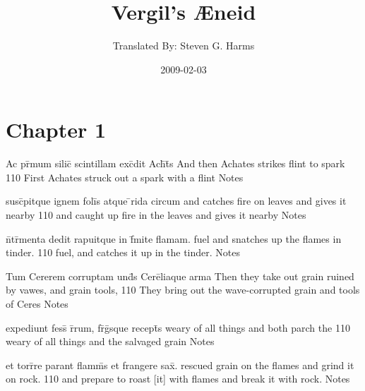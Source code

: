 \documentclass[]{book}
\title{Vergil's {\AE}neid}
\author{ Translated By:  Steven G. Harms }
\date{2009-02-03}
\begin{document}

\ifpdf
{}
\else
{}
\fi

\enumstyle 

\maketitle
\tableofcontents

\chapter{Chapter 1}
%
%
%
%
%
%


\latline
  {Ac pr\={\macron {\i}}mum silic\={\macron {\i}} scintillam exc\={}dit Ach\={}t\={}s}
  { And then Achates strikes flint to spark }
  {110}
  { First Achates struck out a spark with a flint }
  { Notes }



\latline
  {susc\={}pitque ignem foli\={\macron {\i}}s atque \={}rida circum}
  { and catches fire on leaves and gives it nearby }
  {110}
  { and caught up fire in the leaves and gives it nearby }
  { Notes }


\latline
  {n\={}tr\={\macron {\i}}menta dedit rapuitque in f\={}mite flamam.}
  { fuel and snatches up the flames in tinder. }
  {110}
  { fuel, and catches it up in the tinder. }
  { Notes }


\latline
  {Tum Cererem corruptam und\={\macron {\i}}s Cere\={}liaque arma}
  { Then they take out grain ruined by vawes, and grain tools, }
  {110}
  { They bring out the wave-corrupted grain and tools of Ceres }
  { Notes }



\latline
  {expediunt fess\={\macron {\i}} r\={}rum, fr\={}g\={}sque recept\={}s}
  { weary of all things and both parch the  }
  {110}
  { weary of all things and the salvaged grain }
  { Notes }


\latline
  {et torr\={}re parant flamm\={\macron {\i}}s et frangere sax\={}.}
  { rescued grain on the flames and grind it on rock. }
  {110}
  { and prepare to roast [it] with flames and break it with rock. }
  { Notes }
\end{document}
